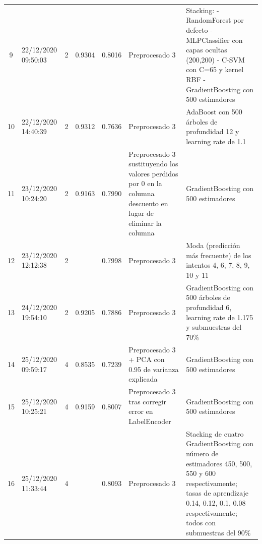 \documentclass{article}
\begin{document}
\begin{longtable}{|c|C{2.1cm}|c|c|c|C{4cm}|C{6cm}|}
\midrule

9 & 22/12/2020 09:50:03 & 2 & 0.9304 & 0.8016 & Preprocesado 3 & Stacking: - RandomForest por defecto - MLPClassifier con capas ocultas (200,200) - C-SVM con C=65 y kernel RBF - GradientBoosting con 500 estimadores \\

\midrule

10 & 22/12/2020 14:40:39 & 2 & 0.9312 & 0.7636 & Preprocesado 3 & AdaBoost con 500 árboles de profundidad 12 y learning rate de 1.1 \\

\midrule

11 & 23/12/2020 10:24:20 & 2 & 0.9163 & 0.7990 & Preprocesado 3 sustituyendo los valores perdidos por 0 en la columna descuento en lugar de eliminar la columna & GradientBoosting con 500 estimadores \\

\midrule

12 & 23/12/2020 12:12:38 & 2 &  & 0.7998 & Preprocesado 3 & Moda (predicción más frecuente) de los intentos 4, 6, 7, 8, 9, 10 y 11 \\

\midrule

13 & 24/12/2020 19:54:10 & 2 & 0.9205 & 0.7886 & Preprocesado 3 & GradientBoosting con 500 árboles de profundidad 6, learning rate de 1.175 y submuestras del 70\% \\

\midrule

14 & 25/12/2020 09:59:17 & 4 & 0.8535 & 0.7239 & Preprocesado 3 + PCA con 0.95 de varianza explicada & GradientBoosting con 500 estimadores \\

\midrule

15 & 25/12/2020 10:25:21 & 4 & 0.9159 & 0.8007 & Preprocesado 3 tras corregir error en LabelEncoder & GradientBoosting con 500 estimadores \\

\midrule

16 & 25/12/2020 11:33:44 & 4 &  & 0.8093 & Preprocesado 3 & Stacking de cuatro GradientBoosting con número de estimadores 450, 500, 550 y 600 respectivamente; tasas de aprendizaje 0.14, 0.12, 0.1, 0.08 respectivamente; todos con submuestras del 90\% \\


\end{longtable}
\end{document}

